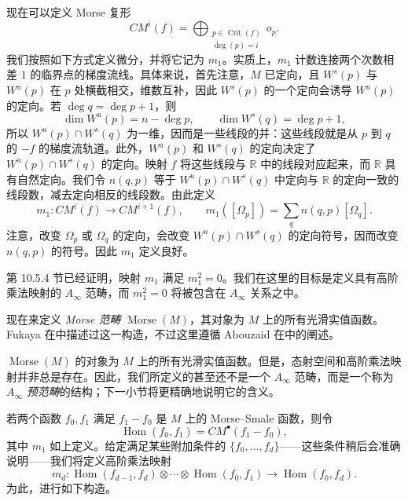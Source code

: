 现在可以定义 Morse 复形
\[
CM^i(f)=\bigoplus_{\substack{p\in\operatorname{Crit}(f)\\\deg(p)=i}}o_p.
\]
我们按照如下方式定义微分，并将它记为 $m_1$。实质上，$m_1$ 计数连接两个次数相差 $1$ 的临界点的梯度流线。具体来说，首先注意，$M$ 已定向，且 $W^s(p)$ 与 $W^u(p)$ 在 $p$ 处横截相交，维数互补，因此 $W^s(p)$ 的一个定向会诱导 $W^u(p)$ 的定向。若 $\deg q=\deg p+1$，则
\[
\dim W^u(p)=n-\deg p,\qquad \dim W^s(q)=\deg p+1,
\]
所以 $W^u(p)\cap W^s(q)$ 为一维，因而是一些线段的并：这些线段就是从 $p$ 到 $q$ 的 $-f$ 的梯度流轨道。此外，$W^u(p)$ 和 $W^s(q)$ 的定向决定了 $W^u(p)\cap W^s(q)$ 的定向。映射 $f$ 将这些线段与 $\mathbb R$ 中的线段对应起来，而 $\mathbb R$ 具有自然定向。我们令 $n(q,p)$ 等于 $W^u(p)\cap W^s(q)$ 中定向与 $\mathbb R$ 的定向一致的线段数，减去定向相反的线段数。由此定义
\[
m_1\colon CM^i(f)\longrightarrow CM^{i+1}(f),
\qquad
m_1([\Omega_p])=\sum_q n(q,p)[\Omega_q].
\]
注意，改变 $\Omega_p$ 或 $\Omega_q$ 的定向，会改变 $W^u(p)\cap W^s(q)$ 的定向符号，因而改变 $n(q,p)$ 的符号。因此 $m_1$ 定义良好。

 第 10.5.4 节已经证明，映射 $m_1$ 满足 $m_1^2=0$。我们在这里的目标是定义具有高阶乘法映射的 $A_\infty$ 范畴，而 $m_1^2=0$ 将被包含在 $A_\infty$ 关系之中。

现在来定义 \emph{Morse 范畴} $\operatorname{Morse}(M)$，其对象为 $M$ 上的所有光滑实值函数。Fukaya 在中描述过这一构造，不过这里遵循 Abouzaid 在中的阐述。

$\operatorname{Morse}(M)$ 的对象为 $M$ 上的所有光滑实值函数。但是，态射空间和高阶乘法映射并非总是存在。因此，我们所定义的甚至还不是一个 $A_\infty$ 范畴，而是一个称为 $A_\infty$ \emph{预范畴}的结构；下一小节将更精确地说明它的含义。

若两个函数 $f_0,f_1$ 满足 $f_1-f_0$ 是 $M$ 上的 Morse--Smale 函数，则令
\[
\operatorname{Hom}(f_0,f_1)=CM^\bullet(f_1-f_0),
\]
其中 $m_1$ 如上定义。给定满足某些附加条件的 $\{f_0,\ldots,f_d\}$——这些条件稍后会准确说明——我们将定义高阶乘法映射
\[
m_d\colon\operatorname{Hom}(f_{d-1},f_d)\otimes\cdots\otimes
\operatorname{Hom}(f_0,f_1)\longrightarrow\operatorname{Hom}(f_0,f_d).
\]
为此，进行如下构造。

